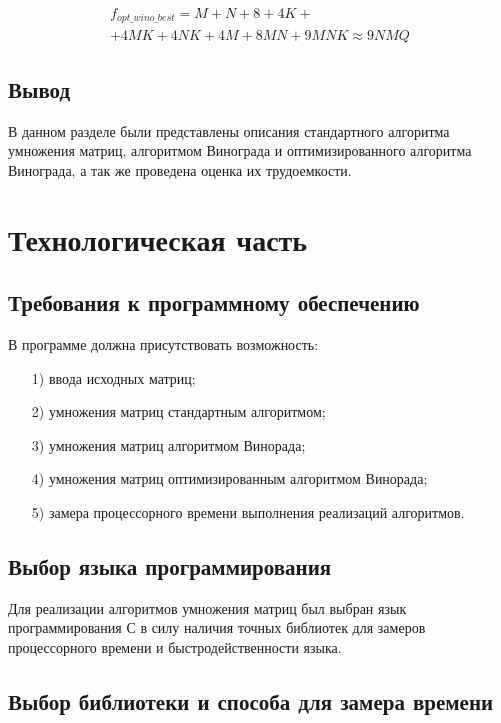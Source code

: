 \documentclass[a4paper,14pt, unknownkeysallowed]{extreport}
\begin{document}
\begin{equation}
    \begin{gathered}
	   f_{opt\_wino\_best} = M + N + 8 + 4K + \\ + 4MK + 4NK + 4M + 8MN + 9MNK \approx 9NMQ
    \end{gathered}
\end{equation}
	

	
\section*{Вывод}
	
В данном разделе были представлены описания стандартного алгоритма умножения матриц, алгоритмом Винограда и оптимизированного алгоритма Винограда, а так же проведена оценка их трудоемкости.
	
\chapter{Технологическая часть}
	
\section{Требования к программному обеспечению}
	
В программе должна присутствовать возможность:
	
\begin{enumerate}
	\item[1)] ввода исходных матриц;
	\item[2)] умножения матриц стандартным алгоритмом;
    \item[3)] умножения матриц алгоритмом Винорада;
    \item[4)] умножения матриц оптимизированным алгоритмом Винорада;
	\item[5)] замера процессорного времени выполнения реализаций алгоритмов.
\end{enumerate}
	
\section{Выбор языка программирования}
	
Для реализации алгоритмов умножения матриц был выбран язык программирования С в силу наличия точных библиотек для замеров процессорного времени и быстродейственности языка.
	
\section{Выбор библиотеки и способа для замера времени}
\end{document}
